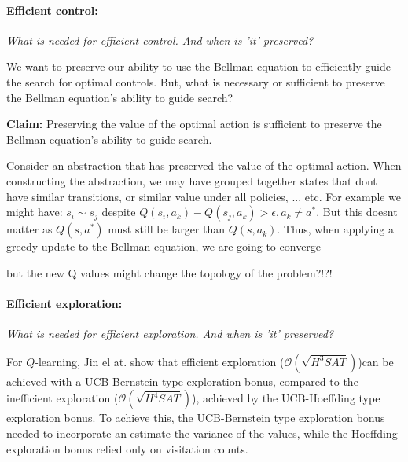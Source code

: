 \paragraph{Efficient control:} \textit{What is needed for efficient control. And when is 'it' preserved?}

We want to preserve our ability to use the Bellman equation to efficiently guide the search for optimal controls.
But, what is necessary or sufficient to preserve the Bellman equation's ability to guide search?

\begin{displayquote}
\textbf{Claim:} Preserving the value of the optimal action is sufficient to preserve the Bellman equation's ability to guide search.
\end{displayquote}

Consider an abstraction that has preserved the value of the optimal action.
When constructing the abstraction, we may have grouped together states that dont have similar transitions, or similar value under all policies, ... etc.
For example we might have: $s_i \sim s_j$ despite $Q(s_i, a_k) - Q(s_j, a_k) > \epsilon, a_k \neq a^{* }$.
But this doesnt matter as $Q(s, a^{* })$ must still be larger than $Q(s, a_k)$.
Thus, when applying a greedy update to the Bellman equation, we are going to converge
\footnotemark[26]

{\color{red}but the new Q values might change the topology of the problem?!?!}


\paragraph{Efficient exploration:} \textit{What is needed for efficient exploration. And when is 'it' preserved?}

For $Q$-learning, Jin el at. \cite{Bubeck2018} show that efficient exploration ($\mathcal O(\sqrt{H^3SAT})$)\footnotemark[13] can be
achieved with a UCB-Bernstein type exploration bonus, compared to the inefficient exploration ($\mathcal O(\sqrt{H^4SAT})$),
achieved by the UCB-Hoeffding type exploration bonus. To achieve this, the UCB-Bernstein type exploration bonus needed to incorporate an
estimate the variance of the values, while the Hoeffding exploration bonus relied only on visitation counts.

